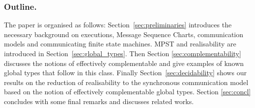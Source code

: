 









\subsubsection*{Outline.} The paper is organised as follows: Section~\ref{sec:preliminaries} introduces the necessary background on executions, Message Sequence Charts, communication models and communicating finite state machines. 
MPST and realisability are introduced in Section~\ref{sec:global_types}. Then Section \ref{sec:complementability} discusses the notions of effectively complementable and give examples of known global types that follow in this class. Finally Section~\ref{sec:decidability}  shows  our results on the reduction of realisability to the synchronous communication model based on the notion of effectively complementable global types.  
Section \ref{sec:concl} concludes with some final remarks and discusses related works.



